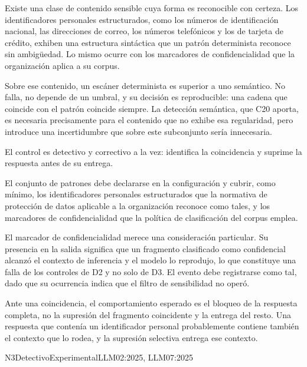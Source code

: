 Existe una clase de contenido sensible cuya forma es reconocible con certeza. Los identificadores personales estructurados, como los números de identificación nacional, las direcciones de correo, los números telefónicos y los de tarjeta de crédito, exhiben una estructura sintáctica que un patrón determinista reconoce sin ambigüedad. Lo mismo ocurre con los marcadores de confidencialidad que la organización aplica a su corpus.

Sobre ese contenido, un escáner determinista es superior a uno semántico. No falla, no depende de un umbral, y su decisión es reproducible: una cadena que coincide con el patrón coincide siempre. La detección semántica, que C20 aporta, es necesaria precisamente para el contenido que no exhibe esa regularidad, pero introduce una incertidumbre que sobre este subconjunto sería innecesaria.

El control es detectivo y correctivo a la vez: identifica la coincidencia y suprime la respuesta antes de su entrega.

El conjunto de patrones debe declararse en la configuración y cubrir, como mínimo, los identificadores personales estructurados que la normativa de protección de datos aplicable a la organización reconoce como tales, y los marcadores de confidencialidad que la política de clasificación del corpus emplea.

El marcador de confidencialidad merece una consideración particular. Su presencia en la salida significa que un fragmento clasificado como confidencial alcanzó el contexto de inferencia y el modelo lo reprodujo, lo que constituye una falla de los controles de D2 y no solo de D3. El evento debe registrarse como tal, dado que su ocurrencia indica que el filtro de sensibilidad no operó.

Ante una coincidencia, el comportamiento esperado es el bloqueo de la respuesta completa, no la supresión del fragmento coincidente y la entrega del resto. Una respuesta que contenía un identificador personal probablemente contiene también el contexto que lo rodea, y la supresión selectiva entrega ese contexto.


  {N3}{Detectivo}{Experimental}{LLM02:2025, LLM07:2025}

